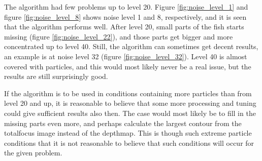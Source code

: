 The algorithm had few problems up to level 20. Figure \ref{fig:noise_level_1} and figure \ref{fig:noise_level_8} shows noise level 1 and 8, respectively, and it is seen that the algorithm performs well. After level 20, small parts of the fish starts missing (figure \ref{fig:noise_level_22}), and those parts get bigger and more concentrated up to level 40. Still, the algorithm can sometimes get decent results, an example is at noise level 32 (figure \ref{fig:noise_level_32}). Level 40 is almost covered with particles, and this would most likely never be a real issue, but the results are still surprisingly good.

If the algorithm is to be used in conditions containing more particles than from level 20 and up, it is reasonable to believe that some more processing and tuning could give sufficient results also then. The case would most likely be to fill in the missing parts even more, and perhaps calculate the largest contour from the totalfocus image instead of the depthmap. This is though such extreme particle conditions that it is not reasonable to believe that such conditions will occur for the given problem.


